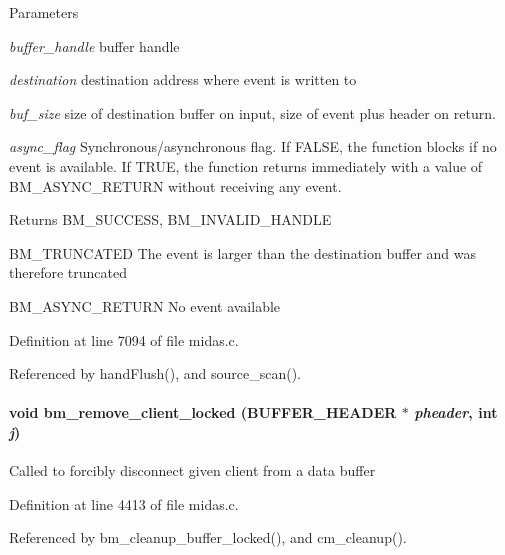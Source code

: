 \begin{DoxyParams}{Parameters}
\item[{\em buffer\_\-handle}]buffer handle \item[{\em destination}]destination address where event is written to \item[{\em buf\_\-size}]size of destination buffer on input, size of event plus header on return. \item[{\em async\_\-flag}]Synchronous/asynchronous flag. If FALSE, the function blocks if no event is available. If TRUE, the function returns immediately with a value of BM\_\-ASYNC\_\-RETURN without receiving any event. \end{DoxyParams}
\begin{DoxyReturn}{Returns}
BM\_\-SUCCESS, BM\_\-INVALID\_\-HANDLE \par
 BM\_\-TRUNCATED The event is larger than the destination buffer and was therefore truncated \par
 BM\_\-ASYNC\_\-RETURN No event available 
\end{DoxyReturn}


Definition at line 7094 of file midas.c.

Referenced by handFlush(), and source\_\-scan().
\paragraph[{bm\_\-remove\_\-client\_\-locked}]{\setlength{\rightskip}{0pt plus 5cm}void bm\_\-remove\_\-client\_\-locked ({\bf BUFFER\_\-HEADER} $\ast$ {\em pheader}, \/  int {\em j})}\hfill\label{group__bmfunctionc_gaf13b277e24b666918ee8aec0160f5288}
Called to forcibly disconnect given client from a data buffer 

Definition at line 4413 of file midas.c.

Referenced by bm\_\-cleanup\_\-buffer\_\-locked(), and cm\_\-cleanup().
